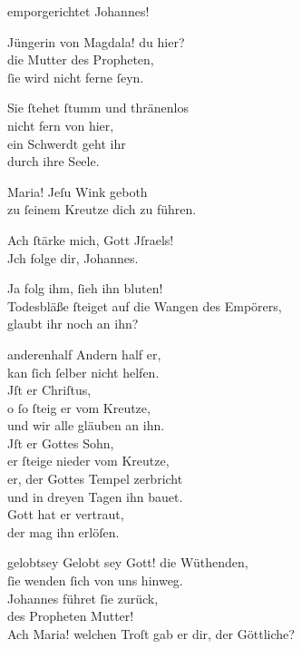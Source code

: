 \documentclass[abbrwidth=6em,tocstyle=ref-genre,toe=false]{ees}
\begin{document}
{\begin{movement}{emporgerichtet}
  Johannes!

  \voice[Johannes]
  Jüngerin von Magdala! du hier?\\
  die Mutter des Propheten,\\
  ſie wird nicht ferne ſeyn.

  Sie ſtehet ſtumm und thränenlos\\
  nicht fern von hier,\\
  ein Schwerdt geht ihr\\
  durch ihre Seele.

  \voice[Johannes]
  Maria! Jeſu Wink geboth\\
  zu ſeinem Kreutze dich zu führen.

  \voice[Maria]
  Ach ſtärke mich, Gott Jſraels!\\
  Jch folge dir, Johannes.

  Ja folg ihm, ſieh ihn bluten!\\
  Todesbläße ſteiget auf die Wangen des Empörers,\\
  glaubt ihr noch an ihn?
\end{movement}

\begin{movement}{anderenhalf}
  Andern half er,\\
  kan ſich ſelber nicht helfen.\\
  Jſt er Chriſtus,\\
  o ſo ſteig er vom Kreutze,\\
  und wir alle gläuben an ihn.\\
  Jſt er Gottes Sohn,\\
  er ſteige nieder vom Kreutze,\\
  er, der Gottes Tempel zerbricht\\
  und in dreyen Tagen ihn bauet.\\
  Gott hat er vertraut,\\
  der mag ihn erlöſen.
\end{movement}

\begin{movement}{gelobtsey}
  \voice[Nikodemus]
  Gelobt sey Gott! die Wüthenden,\\
  ſie wenden ſich von uns hinweg.\\
  Johannes führet ſie zurück,\\
  des Propheten Mutter!\\
  Ach Maria! welchen Troſt gab er dir, der Göttliche?


\end{movement}}
\end{document}
